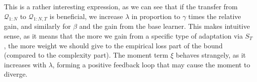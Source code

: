 \documentclass[letterpaper]{article}
\theoremstyle{definition}
\begin{document}
This is a rather interesting expression, as we can see that if the transfer from $\mathcal{Q}_{1:N}$ to $\mathcal{Q}_{1:N,T}$ is beneficial, we increase $\lambda$ in proportion to $\gamma$ times the relative gain, and similarly for $\beta$ and the gain from the base learner. This makes intuitive sense, as it means that the more we gain from a specific type of adaptation via $S_T$, the more weight we should give to the empirical loss part of the bound (compared to the complexity part). The moment term $\xi$ behaves strangely, as it increases with $\lambda$, forming a positive feedback loop that may cause the moment to diverge. 

%
%
%
%
%
%
%
%
\end{document}

